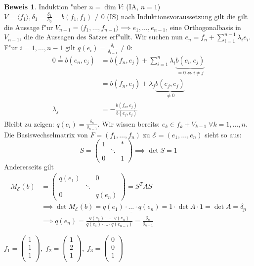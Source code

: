 \documentclass[oneside,fontsize=11pt,paper=a4,BCOR=0mm,DIV=12,automark,headsepline]{scrbook}
\theoremstyle{remark}
\theoremstyle{definition}
\theoremstyle{definition}
\newtheorem*{prof}{Beweis}
\theoremstyle{remark}
\begin{document}
\begin{prof}
  Induktion "uber $n=\dim V$: (IA, $n=1$) $V=\langle f_1 \rangle, \delta_1 = \frac{\delta_1}{\delta_0} = b(f_1, f_1) \neq 0$ (IS) nach Induktionsvoraussetzung gilt die gilt die Aussage f"ur
  $V_{n-1}=\langle f_1,\ldots,f_{n-1} \rangle\implies e_1,\dots, e_{n-1}$, eine Orthogonalbasis in \(V_{n-1}\), die die Aussagen des Satzes erf"ullt. Wir suchen nun \(e_n = f_n + \sum_{i=1}^{n-1}\lambda_i e_i\). F"ur \(i=1,\dots,n-1\) gilt \(q(e_i) = \frac{\delta_i}{\delta_{i-1}} \neq 0\):
  \begin{align*}
    0 \overset{!}{=} b(e_n, e_j) &= b(f_n, e_j) + \sum_{i=1}^n\lambda_i\underbrace{b(e_i,e_j)}_{=0\iff i\neq j} \\
                                 &= b(f_n, e_j) + \lambda_j\underbrace{b(e_j, e_j)}_{\neq 0} \\
    \lambda_j &= -\frac{b(f_n, e_j)}{b(e_j, e_j)}
  \end{align*}
  Bleibt zu zeigen: \(q(e_i) = \frac{\delta_n}{\delta_{n-1}}\). Wir wissen bereits: \(e_k \in f_k + V_{k-1}\;\forall k=1,\dots,n\). Die Basiswechselmatrix von \(F = (f_1,\dots, f_n)\) zu \(\mathcal{E} = (e_1, \dots, e_n)\) sieht so aus:
  \[ S=
    \begin{pmatrix}
      1 & & * \\
      & \ddots & \\
      0 & & 1
    \end{pmatrix} \implies \det S = 1\]
  Andererseits gilt
  \begin{align*}
    M_{\mathcal{E}}(b) &= \begin{pmatrix}q(e_1) & & 0\\ & \ddots & \\ 0 & & q(e_n)\end{pmatrix} = S^TAS \\
                       &\implies \det M_{\mathcal{E}}(b) = \underline{q(e_1)\cdot\dots\cdot q(e_n)} = 1\cdot\det A\cdot 1 = \det A = \underline{\delta_n} \\
                       &\implies q(e_n) = \frac{q(e_1)\cdot\dots\cdot q(e_n)}{q(e_1)\cdot\dots\cdot q(e_{n-1})} = \frac{\delta_n}{\delta_{n-1}}
  \end{align*}
\end{prof}

\begin{exa}
  $f_1=\begin{pmatrix}1\\ 1\\ 1\\\end{pmatrix},\;f_2=\begin{pmatrix}1\\ 2\\ 1\\\end{pmatrix},\;f_3=\begin{pmatrix}0\\ 0\\ 1\\\end{pmatrix}$
\end{exa}
\end{document}
